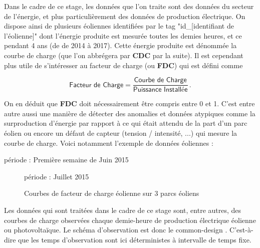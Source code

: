 
Dans le cadre de ce stage, les données que l'on traite sont des données du secteur de l'énergie, et plus particulièrement des données de production électrique. On dispose ainsi de plusieurs éoliennes identifiées par le tag "id\_[identifiant de l'éolienne]" dont l'énergie produite est mesurée toutes les demies heures, et ce pendant 4 ans (de de 2014 à 2017).
Cette énergie produite est dénommée la courbe de charge (que l'on abbrégera par \textbf{CDC} par la suite). Il est cependant plus utile de s'intéresser au facteur de charge (ou \textbf{FDC}) qui est défini comme

\begin{equation*}
\displaystyle\textsf{Facteur de Charge} = \frac{\textsf{Courbe de Charge}}{\textsf{Puissance Installée}} \, .
\end{equation*}

On en déduit que \textbf{FDC} doit nécessairement être compris entre 0 et 1. C'est entre autre aussi une manière de détecter des anomalies et données atypiques comme la surproduction d'énergie par rapport à ce qui était attendu de la part d'un parc éolien ou encore un défaut de capteur (tension / intensité, ...) qui mesure la courbe de charge. Voici notamment l'exemple de données éoliennes :


\begin{center}
	période : Première semaine de Juin 2015
	
\end{center}

\begin{figure}[H]
	\centering

	période : Juillet 2015

	\caption{Courbes de facteur de charge éolienne sur 3 parcs éoliens}
	\label{fig:courbes_de_charge}
\end{figure}

\bigskip

Les données qui sont traitées dans le cadre de ce stage sont, entre autres, des courbes de charge observées chaque demie-heure de production électrique éolienne ou photovoltaïque. Le schéma d’observation est donc le \og common-design \fg. C'est-à-dire que les temps d'observation sont ici déterministes à intervalle de temps fixe.